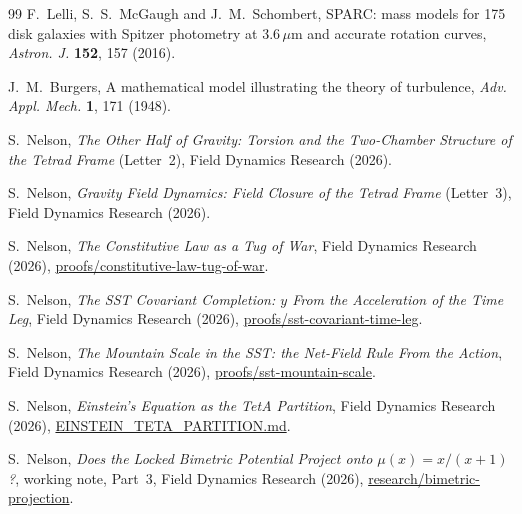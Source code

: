 \documentclass[twocolumn]{iopjournal}
\theoremstyle{definition}
\theoremstyle{remark}
\begin{document}
\begin{thebibliography}{99}
F.~Lelli, S.~S.~McGaugh and J.~M.~Schombert,
SPARC: mass models for 175 disk galaxies with Spitzer photometry at
3.6\,$\mu$m and accurate rotation curves, \textit{Astron. J.}
\textbf{152}, 157 (2016).

J.~M.~Burgers,
A mathematical model illustrating the theory of turbulence,
\textit{Adv. Appl. Mech.} \textbf{1}, 171 (1948).

S.~Nelson, \textit{The Other Half of Gravity: Torsion and the Two-Chamber
Structure of the Tetrad Frame} (Letter~2), Field Dynamics Research (2026).

S.~Nelson, \textit{Gravity Field Dynamics: Field Closure of the Tetrad
Frame} (Letter~3), Field Dynamics Research (2026).

S.~Nelson, \textit{The Constitutive Law as a Tug of War}, Field Dynamics
Research (2026), \url{proofs/constitutive-law-tug-of-war}.

S.~Nelson, \textit{The SST Covariant Completion: $y$ From the
Acceleration of the Time Leg}, Field Dynamics Research (2026),
\url{proofs/sst-covariant-time-leg}.

S.~Nelson, \textit{The Mountain Scale in the SST: the Net-Field Rule
From the Action}, Field Dynamics Research (2026),
\url{proofs/sst-mountain-scale}.

S.~Nelson, \textit{Einstein's Equation as the TetA Partition}, Field
Dynamics Research (2026), \url{EINSTEIN_TETA_PARTITION.md}.

S.~Nelson, \textit{Does the Locked Bimetric Potential Project onto
$\mu(x) = x/(x+1)$?}, working note, Part~3, Field Dynamics Research
(2026), \url{research/bimetric-projection}.

\end{thebibliography}
\end{document}

